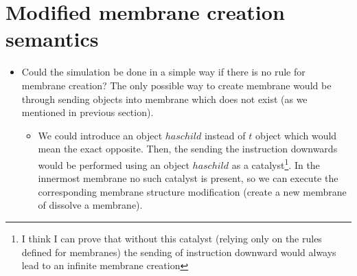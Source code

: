 \documentclass[llncs,submission,copyright,creativecommons]{../lib/lncs/llncs}
\begin{document}
\section{Modified membrane creation semantics} %
\label{sec:modified_membrane_creation_semantics}

\begin{itemize}
  \item Could the simulation be done in a simple way if there is no rule for membrane creation? The only possible way to create membrane would be through sending objects into membrane which does not exist (as we mentioned in previous section).
  \begin{itemize}
    \item We could introduce an object $haschild$ instead of $t$ object which would mean the exact opposite. Then, the sending the instruction downwards would be performed using an object $haschild$ as a catalyst\footnote{I think I can prove that without this catalyst (relying only on the rules defined for membranes) the sending of instruction downward would always lead to an infinite membrane creation}. In the innermost membrane no such catalyst is present, so we can execute the corresponding membrane structure modification (create a new membrane of dissolve a membrane).
  \end{itemize}
\end{itemize}



\end{document}
